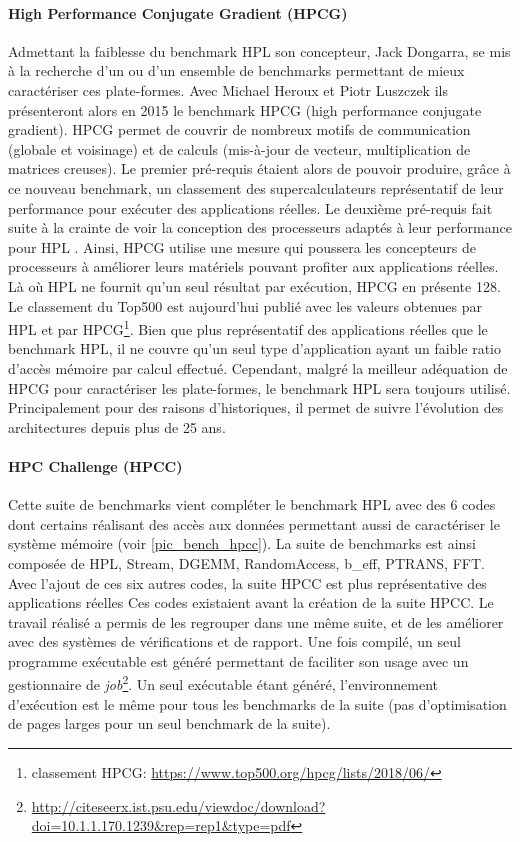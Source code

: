 \paragraph{High Performance Conjugate Gradient (HPCG) \cite{Dongarra2013}} 
Admettant la faiblesse du benchmark HPL son concepteur, Jack Dongarra, se mis à la recherche d'un ou d'un ensemble de benchmarks permettant de mieux caractériser ces plate-formes. Avec Michael Heroux et Piotr Luszczek ils présenteront alors en 2015 le benchmark HPCG (high performance conjugate gradient). HPCG permet de couvrir de nombreux motifs de communication (globale et voisinage) et de calculs  (mis-à-jour de vecteur, multiplication de matrices creuses). 
Le premier pré-requis étaient alors de pouvoir produire, grâce à ce nouveau benchmark, un classement des supercalculateurs représentatif de leur performance pour exécuter des applications réelles. Le deuxième pré-requis fait suite à la crainte de voir la conception des processeurs adaptés à leur performance pour HPL \cite{Dongarra2013}. Ainsi, HPCG utilise une mesure qui poussera les concepteurs de processeurs à améliorer leurs matériels pouvant profiter aux applications réelles. Là où HPL ne fournit qu'un seul résultat par exécution, HPCG en présente 128. Le classement du Top500 est aujourd'hui publié avec les valeurs obtenues par HPL et par HPCG\footnote{classement HPCG: \url{https://www.top500.org/hpcg/lists/2018/06/}}. Bien que plus représentatif des applications réelles que le benchmark HPL, il ne couvre qu'un seul type d'application ayant un faible ratio d'accès mémoire par calcul effectué. Cependant, malgré la meilleur adéquation de HPCG pour caractériser les plate-formes, le benchmark HPL sera toujours utilisé. Principalement pour des raisons d'historiques, il permet de suivre l'évolution des architectures depuis plus de 25 ans. 





\paragraph{HPC Challenge (HPCC)} Cette suite de benchmarks vient compléter le benchmark HPL avec des 6 codes dont certains réalisant des accès aux données permettant aussi de caractériser le système mémoire (voir \autoref{pic_bench_hpcc}). La suite de benchmarks est ainsi composée de HPL, Stream, DGEMM, RandomAccess, b\_eff, PTRANS, FFT. Avec l'ajout de ces six autres codes, la suite HPCC est plus représentative des applications réelles Ces codes existaient avant la création de la suite HPCC. Le travail réalisé a permis de les regrouper dans une même suite, et de les améliorer avec des systèmes de vérifications et de rapport. Une fois compilé, un seul programme exécutable est généré permettant de faciliter son usage avec un gestionnaire de \textit{job}\footnote{\url{http://citeseerx.ist.psu.edu/viewdoc/download?doi=10.1.1.170.1239&rep=rep1&type=pdf}}. Un seul exécutable étant généré, l'environnement d'exécution est le même pour tous les benchmarks de la suite (pas d'optimisation de pages larges pour un seul benchmark de la suite). 

